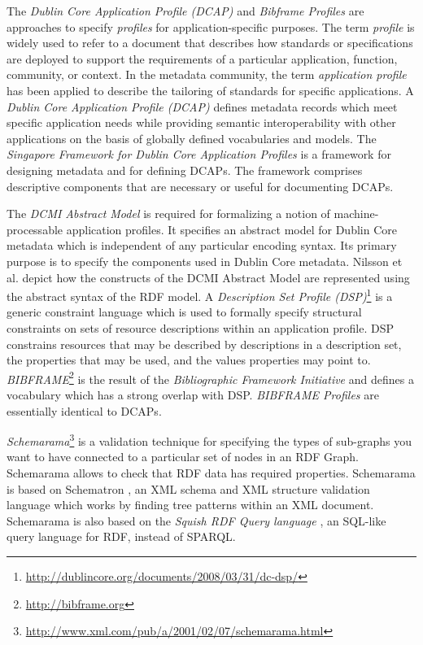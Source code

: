 \documentclass[a4paper,fontsize=11pt]{scrartcl}
\begin{document}
The \emph{Dublin Core Application Profile (DCAP)} and \emph{Bibframe Profiles} are approaches to specify \emph{profiles} for application-specific purposes. The term \emph{profile} is widely used to refer to a document that describes how standards or specifications are deployed to support the requirements of a particular application, function, community, or context. In the metadata community, the term \emph{application profile} has been applied to describe the tailoring of standards for specific applications. A \emph{Dublin Core Application Profile (DCAP)} \cite{DCMI-DCAP-2009} defines metadata records which meet specific application needs while providing semantic interoperability with other applications on the basis of globally defined vocabularies and models. The \emph{Singapore Framework for Dublin Core Application Profiles} \cite{DCMI-Singapore-2008} is a framework for designing metadata and for defining DCAPs. The framework comprises descriptive components that are necessary or useful for documenting DCAPs.

The \emph{DCMI Abstract Model} \cite{DCMI-Abstract-Model-2007} is required for formalizing a notion of machine-processable application profiles. It specifies an abstract model for Dublin Core metadata which is independent of any particular encoding syntax. Its primary purpose is to specify the components used in Dublin Core metadata. Nilsson et al. \cite{DCMI-DC-RDF-2008} depict how the constructs of the DCMI Abstract Model are represented using the abstract syntax of the RDF model. A \emph{Description Set Profile (DSP)}\footnote{\url{ http://dublincore.org/documents/2008/03/31/dc-dsp/}} \cite{DCMI-DSP-2008} is a generic constraint language which is used to formally specify structural constraints on sets of resource descriptions within an application profile. DSP constrains resources that may be described by descriptions in a description set, the properties that may be used, and the values properties may point to. \emph{BIBFRAME}\footnote{\url{http://bibframe.org}} \cite{Kroeger-2013,Godby-2015,Miller-2012} is the result of the \emph{Bibliographic Framework Initiative} and defines a vocabulary \cite{DCMI-Bibframe-Authorities-2014,DCMI-Bibframe-Relationships-2014} which has a strong overlap with DSP. \emph{BIBFRAME Profiles} \cite{DCMI-Bibframe-Profiles-2014} are essentially identical to DCAPs.

\emph{Schemarama}\footnote{\url{http://www.xml.com/pub/a/2001/02/07/schemarama.html}} is a validation technique for specifying the types of sub-graphs you want to have connected to a particular set of nodes in an RDF Graph. Schemarama allows to check that RDF data has required properties. Schemarama is based on Schematron \cite{ISO/IEC-2006}, an XML schema and XML structure validation language which works by finding tree patterns within an XML document. Schemarama is also based on the \emph{Squish RDF Query language} \cite{Miller-2001}, an SQL-like query language for RDF, instead of SPARQL. 
\end{document}

